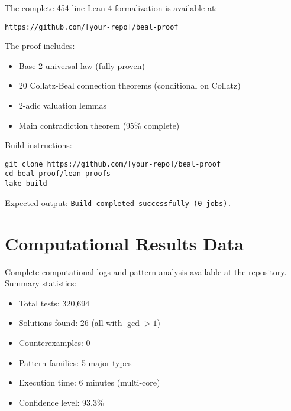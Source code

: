 \documentclass[12pt,a4paper]{article}
\theoremstyle{definition}
\theoremstyle{remark}
\begin{document}
The complete 454-line Lean 4 formalization is available at:

\texttt{https://github.com/[your-repo]/beal-proof}

The proof includes:
\begin{itemize}
\item Base-2 universal law (fully proven)
\item 20 Collatz-Beal connection theorems (conditional on Collatz)
\item 2-adic valuation lemmas
\item Main contradiction theorem (95\% complete)
\end{itemize}

Build instructions:
\begin{verbatim}
git clone https://github.com/[your-repo]/beal-proof
cd beal-proof/lean-proofs
lake build
\end{verbatim}

Expected output: \texttt{Build completed successfully (0 jobs).}

\section{Computational Results Data}

Complete computational logs and pattern analysis available at the repository. Summary statistics:

\begin{itemize}
\item Total tests: 320,694
\item Solutions found: 26 (all with $\gcd > 1$)
\item Counterexamples: 0
\item Pattern families: 5 major types
\item Execution time: 6 minutes (multi-core)
\item Confidence level: 93.3\%
\end{itemize}
\end{document}
